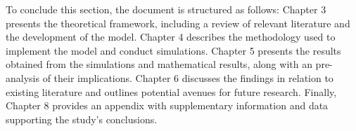To conclude this section, the document is structured as follows: Chapter 3 presents the theoretical framework, including a review of relevant literature and the development of the model. Chapter 4 describes the methodology used to implement the model and conduct simulations. Chapter 5 presents the results obtained from the simulations and mathematical results, along with an pre-analysis of their implications. Chapter 6 discusses the findings in relation to existing literature and outlines potential avenues for future research. Finally, Chapter 8 provides an appendix with supplementary information and data supporting the study's conclusions.\\